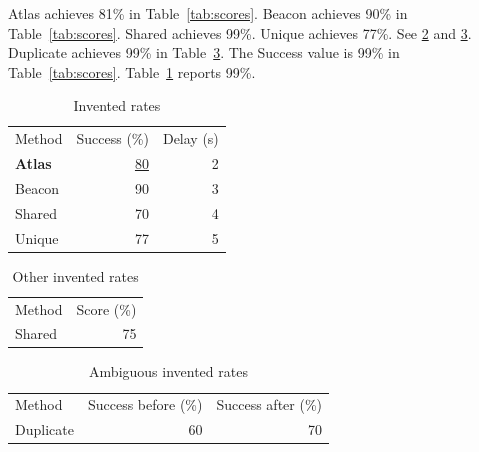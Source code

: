 Atlas achieves 81\% in Table~\ref{tab:scores}.
Beacon achieves 90\% in Table~\ref{tab:scores}.
Shared achieves 99\%.
Unique achieves 77\%.
See \ref{tab:other} and \ref{tab:ambiguous}.
Duplicate achieves 99\% in Table~\ref{tab:ambiguous}.
The Success value is 99\% in Table~\ref{tab:scores}.
Table~\ref{tab:Atlas} reports 99\%.
\begin{table}\caption{Invented rates}\label{tab:scores}\label{tab:Atlas}
\begin{tabular}{lrr}
Method & Success (\%) & Delay (s) \\
\textbf{Atlas} & \underline{80} & 2 \\
Beacon & 90 & 3 \\
Shared & 70 & 4 \\
Unique & 77 & 5 \\
\end{tabular}\end{table}
\begin{table}\caption{Other invented rates}\label{tab:other}
\begin{tabular}{lr}
Method & Score (\%) \\
Shared & 75 \\
\end{tabular}\end{table}
\begin{table}\caption{Ambiguous invented rates}\label{tab:ambiguous}
\begin{tabular}{lrr}
Method & Success before (\%) & Success after (\%) \\
Duplicate & 60 & 70 \\
\end{tabular}\end{table}
\nocite{*}
